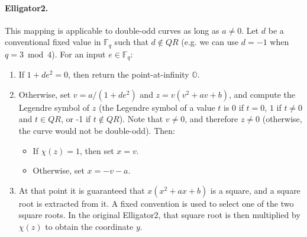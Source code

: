 \documentclass{llncs}
\newcommand{\bF}{\mathbb{F}}
\newcommand{\neutral}{\mathbb{O}}
\begin{document}
\paragraph{Elligator2.} This mapping is applicable to double-odd curves
as long as $a \neq 0$. Let $d$ be a conventional fixed value in $\bF_q$
such that $d \notin QR$ (e.g. we can use $d = -1$ when $q = 3 \bmod 4$).
For an input $e \in \bF_q$:
\begin{enumerate}

    \item If $1 + de^2 = 0$, then return the point-at-infinity $\neutral$.

    \item Otherwise, set $v = a/(1 + de^2)$ and $z = v(v^2 + av + b)$,
    and compute the Legendre symbol of $z$ (the Legendre symbol of a value
    $t$ is $0$ if $t = 0$, $1$ if $t\neq 0$ and $t \in QR$, or -1 if $t
    \notin QR$). Note that $v\neq 0$, and therefore $z\neq 0$ (otherwise,
    the curve would not be double-odd). Then:
    \begin{itemize}
        \item If $\chi(z) = 1$, then set $x = v$.
        \item Otherwise, set $x = -v - a$.
    \end{itemize}

    \item At that point it is guaranteed that $x(x^2 + ax + b)$ is a
    square, and a square root is extracted from it. A fixed convention
    is used to select one of the two square roots. In the original
    Elligator2, that square root is then multiplied by $\chi(z)$ to
    obtain the coordinate $y$.

\end{enumerate}
\end{document}
